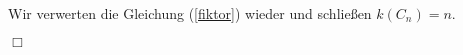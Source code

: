 Wir verwerten die Gleichung (\ref{fiktor}) wieder und schließen $\mathit{k}(C_n)=n$.
\begin{flushright} $\Box$ \end{flushright} 
